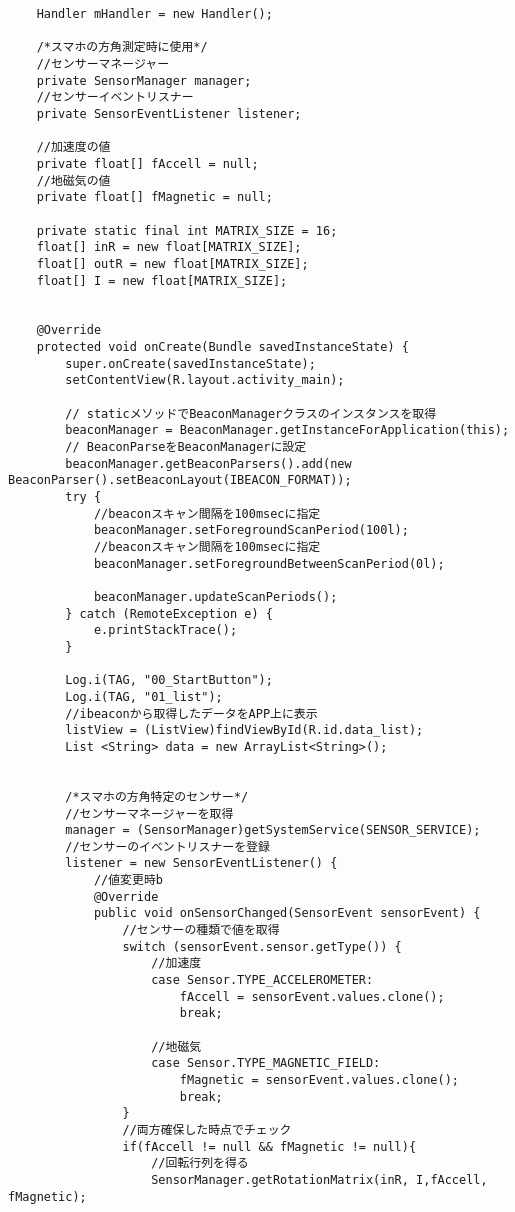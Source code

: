 \documentclass[11pt,a4j]{jarticle}
\begin{document}
\begin{verbatim}
    Handler mHandler = new Handler();

    /*スマホの方角測定時に使用*/
    //センサーマネージャー
    private SensorManager manager;
    //センサーイベントリスナー
    private SensorEventListener listener;

    //加速度の値
    private float[] fAccell = null;
    //地磁気の値
    private float[] fMagnetic = null;

    private static final int MATRIX_SIZE = 16;
    float[] inR = new float[MATRIX_SIZE];
    float[] outR = new float[MATRIX_SIZE];
    float[] I = new float[MATRIX_SIZE];


    @Override
    protected void onCreate(Bundle savedInstanceState) {
        super.onCreate(savedInstanceState);
        setContentView(R.layout.activity_main);

        // staticメソッドでBeaconManagerクラスのインスタンスを取得
        beaconManager = BeaconManager.getInstanceForApplication(this);
        // BeaconParseをBeaconManagerに設定
        beaconManager.getBeaconParsers().add(new BeaconParser().setBeaconLayout(IBEACON_FORMAT));
        try {
            //beaconスキャン間隔を100msecに指定
            beaconManager.setForegroundScanPeriod(100l);
            //beaconスキャン間隔を100msecに指定
            beaconManager.setForegroundBetweenScanPeriod(0l);

            beaconManager.updateScanPeriods();
        } catch (RemoteException e) {
            e.printStackTrace();
        }

        Log.i(TAG, "00_StartButton");
        Log.i(TAG, "01_list");
        //ibeaconから取得したデータをAPP上に表示
        listView = (ListView)findViewById(R.id.data_list);
        List <String> data = new ArrayList<String>();


        /*スマホの方角特定のセンサー*/
        //センサーマネージャーを取得
        manager = (SensorManager)getSystemService(SENSOR_SERVICE);
        //センサーのイベントリスナーを登録
        listener = new SensorEventListener() {
            //値変更時b
            @Override
            public void onSensorChanged(SensorEvent sensorEvent) {
                //センサーの種類で値を取得
                switch (sensorEvent.sensor.getType()) {
                    //加速度
                    case Sensor.TYPE_ACCELEROMETER:
                        fAccell = sensorEvent.values.clone();
                        break;

                    //地磁気
                    case Sensor.TYPE_MAGNETIC_FIELD:
                        fMagnetic = sensorEvent.values.clone();
                        break;
                }
                //両方確保した時点でチェック
                if(fAccell != null && fMagnetic != null){
                    //回転行列を得る
                    SensorManager.getRotationMatrix(inR, I,fAccell, fMagnetic);


\end{verbatim}
\end{document}

